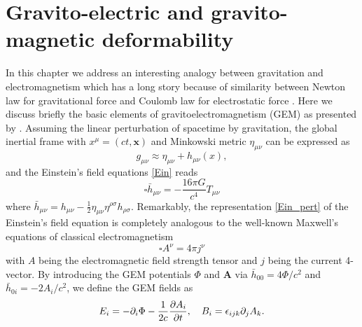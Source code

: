 \section{Gravito-electric and gravito-magnetic deformability}%
\label{sec3.2}
In this chapter we address an interesting analogy between gravitation and electromagnetism
which has a long story because of similarity between Newton law for gravitational 
force and Coulomb law for electrostatic force \cite{mashhoon2003gravitoelectromagnetism}.
Here we discuss briefly the basic elements of gravitoelectromagnetism (\gls{GEM}) as 
presented by \cite{damour2009relativistic}. Assuming the linear perturbation of spacetime
by gravitation, the global inertial frame with $x^{\mu} = (ct, \mathbf{x})$ and 
Minkowski metric $\eta_{\mu\nu}$ can be expressed as
\begin{equation}
    g_{\mu\nu} \approx \eta_{\mu\nu} + h_{\mu\nu}(x),
\end{equation}
and the Einstein's field equations \eqref{Ein} reads
\begin{equation}
    \square \bar{h}_{\mu\nu} = - \frac{16\pi G}{c^4} T_{\mu\nu} \label{Ein_pert}
\end{equation}
where $\bar{h}_{\mu\nu}=h_{\mu\nu}-\frac{1}{2}\eta_{\mu\nu}\eta^{\rho\sigma}h_{\rho\sigma}$. Remarkably, the representation \eqref{Ein_pert} of the Einstein's field equation is 
completely analogous to the well-known Maxwell's equations of classical electromagnetism
\begin{equation}
    \square A^\nu = 4\pi j^\nu
\end{equation}
with $A$ being the electromagnetic field strength tensor and $j$ being the current 
4-vector. By introducing the \gls{GEM} potentials $\Phi$ and $\mathbf{A}$ via 
$\bar{h}_{00}=4\Phi/c^2$ and $\bar{h}_{0i} = -2A_i/c^2$, we define the \gls{GEM} fields as
\begin{equation}
E_{i} = -\partial_i\Phi - \frac{1}{2c}\pdv{A_i}{t},\quad B_i = \epsilon_{ijk}\partial_j A_k.
\end{equation}

